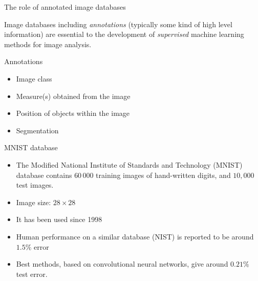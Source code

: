\documentclass[xcolor=pdftex,dvipsnames,table,mathserif]{beamer}
\begin{document}
\begin{frame}{The role of annotated image databases}

  Image databases including \emph{annotations} (typically some kind of high level information) are essential to the development of \emph{supervised} machine learning methods for image analysis.

  \begin{block}{Annotations}
    \begin{itemize}
    \item Image class
    \item Measure(s) obtained from the image
    \item Position of objects within the image
    \item Segmentation
    \end{itemize}
  \end{block}

\end{frame}

\begin{frame}{MNIST database \tiny{\cite{lecun_gradient-based_1998}}}

  \begin{itemize}
  \item The Modified National Institute of Standards and Technology (MNIST) database contains $60\,000$ training images of hand-written digits, and $10,000$ test images.
  \item Image size: $28 \times 28$
  \item It has been used since 1998
  \item Human performance on a similar database (NIST) is reported to be around $1.5\%$ error \cite{simard_efficient_1993}
  \item Best methods, based on convolutional neural networks, give around $0.21\%$ test error.
  \end{itemize}

\end{frame}
\end{document}

